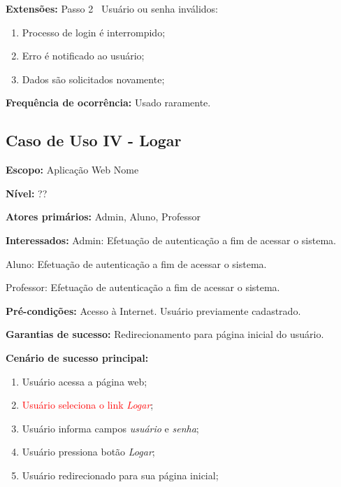 \documentclass[12pt,oneside,a4paper,article]{abntex2}
\begin{document}
		\textbf{Extensões:} Passo 2 \textrightarrow \ Usuário ou senha inválidos:
		
		\begin{enumerate}[label=\alph*.]	
			\item Processo de login é interrompido;
			\item Erro é notificado ao usuário;
			\item Dados são solicitados novamente;	
			
		\end{enumerate}
		
		\textbf{Frequência de ocorrência:} Usado raramente.
		
		\subsection{Caso de Uso IV - Logar}
		
		\textbf{Escopo:} Aplicação Web Nome
		
		\textbf{Nível:} ??
		
		\textbf{Atores primários:} Admin, Aluno, Professor
		
		\textbf{Interessados:} Admin: Efetuação de autenticação a fim de acessar o sistema. 
		
		Aluno: Efetuação de autenticação a fim de acessar o sistema.
		
		Professor: Efetuação de autenticação a fim de acessar o sistema.
		
		\textbf{Pré-condições:} Acesso à Internet. Usuário previamente cadastrado.
		
		\textbf{Garantias de sucesso:} Redirecionamento para página inicial do usuário.
		
		\textbf{Cenário de sucesso principal:}
		
		\begin{enumerate}
			\item Usuário acessa a página web;
			
			\item \textcolor{red}{Usuário seleciona o link \textit{Logar}};
			
			\item Usuário informa campos \textit{usuário} e \textit{senha};
			
			\item Usuário pressiona botão \textit{Logar};
			
			\item Usuário redirecionado para sua página inicial;
			
		\end{enumerate}
		
\end{document}
